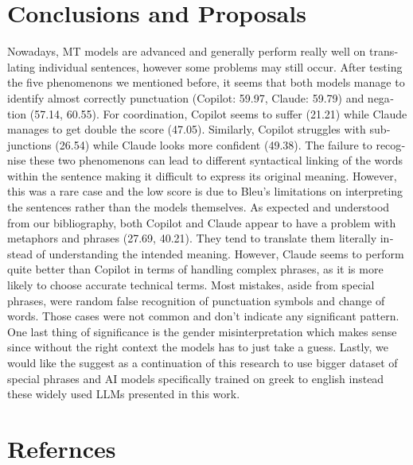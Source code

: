 \documentclass[twocolumn]{article}
\newcommand{\en}[1]{\foreignlanguage{english}{#1}}
\begin{document}
\section{\en{Conclusions and Proposals}}
\en{Nowadays, MT models are advanced and generally perform really well on translating individual sentences, however some problems may still occur. After testing the five phenomenons we mentioned before, it seems that both models manage to identify almost correctly punctuation (Copilot: 59.97, Claude: 59.79) and negation (57.14, 60.55). For coordination, Copilot seems to suffer (21.21) while Claude manages to get double the score (47.05). Similarly, Copilot struggles with subjunctions (26.54) while Claude looks more confident (49.38). The failure to recognise these two phenomenons can lead to different syntactical linking of the words within the sentence making it difficult to express its original meaning. However, this was a rare case and the low score is due to Bleu’s limitations on interpreting the sentences rather than the models themselves. As expected and understood from our bibliography, both Copilot and Claude appear to have a problem with metaphors and phrases (27.69, 40.21). They tend to translate them literally instead of understanding the intended meaning. However, Claude seems to perform quite better than Copilot in terms of handling complex phrases, as it is more likely to choose accurate technical terms. Most mistakes, aside from special phrases, were random false recognition of punctuation symbols and change of words. Those cases were not common and don’t indicate any significant pattern. One last thing of significance is the gender misinterpretation which makes sense since without the right context the models has to just take a guess. 
Lastly, we would like the suggest as a continuation of this research to use bigger dataset of special phrases and AI models specifically trained on greek to english instead these widely used LLMs presented in this work. }
\section{\en{Refernces}}
\en{\printbibliography}
\end{document}
